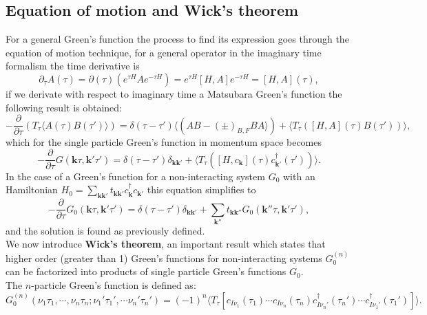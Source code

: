 \documentclass[12pt, a4paper]{report}
\numberwithin{equation}{section}
\begin{document}
\subsection{Equation of motion and Wick's theorem}
For a general Green's function the process to find its expression goes through the equation of motion technique, for a general 
operator in the imaginary time formalism the time derivative is
\begin{equation}
    \partial_\tau A(\tau)= \partial(\tau)\left(e^{\tau H}Ae^{-\tau H}\right)=e^{\tau H}[H,A]e^{-\tau H}=[H,A](\tau),
\end{equation}
if we derivate with respect to imaginary time a Matsubara Green's function the following result is obtained:
\begin{equation}
    -\frac{\partial}{\partial\tau}\left(T_\tau\langle A(\tau)B(\tau')\rangle\right)=\delta(\tau-\tau')\langle(AB-(\pm)_{B,F}BA\rangle)+\langle T_\tau\left([H,A](\tau)B(\tau')\right)\rangle,
\end{equation}
which for the single particle Green's function in momentum space becomes
\begin{equation}
    -\frac{\partial}{\partial \tau} G(\mathbf{k}\tau,\mathbf{k}'\tau')=\delta(\tau-\tau')\delta_{\mathbf{k}\mathbf{k}'}+\langle T_\tau\left([H,c_\mathbf{k}](\tau)c^\dagger_{\mathbf{k}'}(\tau')\right)\rangle.
\end{equation}
In the case of a Green's function for a non-interacting system $G_0$ with an Hamiltonian $H_0=\sum_{\mathbf{kk}'}t_{\mathbf{kk}'}c^\dagger_\mathbf{k}c_{\mathbf{k}'}$ this equation simplifies to
\begin{equation}
    -\frac{\partial}{\partial\tau}G_0(\mathbf{k}\tau,\mathbf{k}'\tau')=\delta(\tau-\tau')\delta_{\mathbf{k}\mathbf{k}'}+\sum_{\mathbf{k}''}t_{\mathbf{kk}''}G_0(\mathbf{k}''\tau,\mathbf{k}'\tau'),
\end{equation}
and the solution is found as previously defined.\\
We now introduce \textbf{Wick's theorem}, an important result which states that higher order (greater than 1) Green's functions for non-interacting 
systems $G_0^{(n)}$ can be factorized into products of single particle Green's functions $G_0$.\\
The $n$-particle Green's function is defined as:
\begin{equation}
    G_0^{(n)}(\nu_1\tau_1,\cdots,\nu_n\tau_n;\nu_1'\tau_1',\cdots\nu_n'\tau_n')=(-1)^n\langle T_\tau \left[c_{I\nu_1}(\tau_1)\cdots c_{I\nu_n}(\tau_n)c^\dagger_{I\nu_n'}(\tau_n')\cdots c^\dagger_{I\nu_1'}(\tau_1')\right]\rangle. 
    \label{G_0_n-order}
\end{equation}
\end{document}
